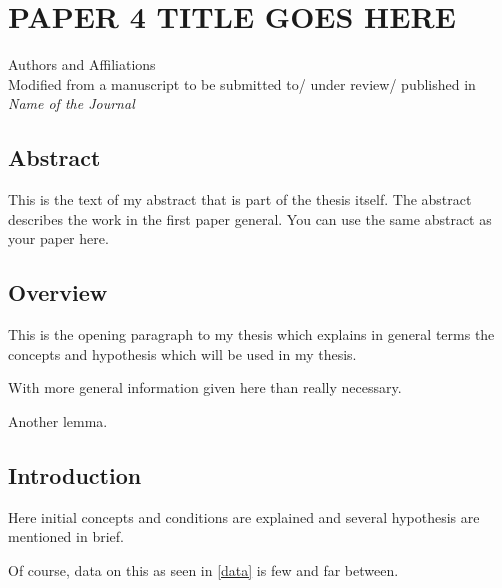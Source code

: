 \chapter{PAPER 4 TITLE GOES HERE}

\begin{center}
    Authors and Affiliations \\
    Modified from a manuscript to be submitted to/ under review/ published in \textit{Name of the Journal}
\end{center}

\section{Abstract}
This is the text of my abstract that is part of the thesis itself.
The abstract describes the work in the first paper general. You can use the same abstract as your paper here.


\section{Overview}

This is the opening paragraph to my thesis which
explains in general terms the concepts and hypothesis
which will be used in my thesis.

With more general information given here than really
necessary.
\begin{lemma}
    Another lemma.
    \label{lem1}
\end{lemma}

\section{Introduction}

Here initial concepts and conditions are explained and
several hypothesis are mentioned in brief.

Of course, data on this as seen in \autoref{data}
is few and far between.


